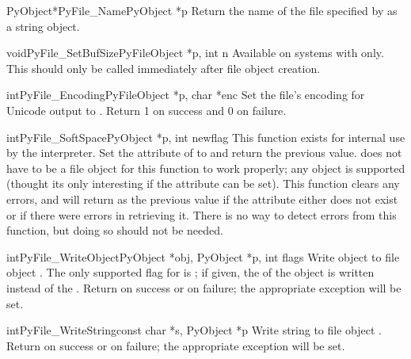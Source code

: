 \begin{cfuncdesc}{PyObject*}{PyFile_Name}{PyObject *p}
  Return the name of the file specified by  as a string
  object.
\end{cfuncdesc}

\begin{cfuncdesc}{void}{PyFile_SetBufSize}{PyFileObject *p, int n}
  Available on systems with 
  only.  This should only be called immediately after file object
  creation.
\end{cfuncdesc}

\begin{cfuncdesc}{int}{PyFile_Encoding}{PyFileObject *p, char *enc}
  Set the file's encoding for Unicode output to . Return
  1 on success and 0 on failure.
\end{cfuncdesc}

\begin{cfuncdesc}{int}{PyFile_SoftSpace}{PyObject *p, int newflag}
  This function exists for internal use by the interpreter.  Set the
   attribute of  to  and
  return the
  previous value.   does not have to be a file object for this
  function to work properly; any object is supported (thought its only
  interesting if the  attribute can be set).  This
  function clears any errors, and will return  as the previous
  value if the attribute either does not exist or if there were errors
  in retrieving it.  There is no way to detect errors from this
  function, but doing so should not be needed.
\end{cfuncdesc}

\begin{cfuncdesc}{int}{PyFile_WriteObject}{PyObject *obj, PyObject *p,
                                           int flags}
  Write object  to file object .  The only supported
  flag for  is
  ; if given, the
   of the object is written instead of the
  .  Return  on success or  on
  failure; the appropriate exception will be set.
\end{cfuncdesc}

\begin{cfuncdesc}{int}{PyFile_WriteString}{const char *s, PyObject *p}
  Write string  to file object .  Return  on
  success or  on failure; the appropriate exception will be
  set.
\end{cfuncdesc}



